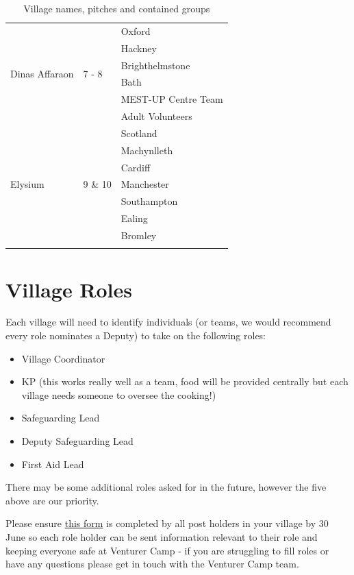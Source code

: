 \documentclass[a4paper, 11pt]{report}
\newcommand{\nl}{\newline}
\begin{document}
{\begin{longtable}{p{} p{} p{}}
        \multirow{6}{*}{Dinas Affaraon} & \multirow{6}{*}{7 - 8} & Oxford\\*
        & & Hackney \\*
        & & Brighthelmstone \\*
        & & Bath \\*
        & & MEST-UP Centre Team \\*
        & & Adult Volunteers \\
        \hline

        \multirow{7}{*}{Elysium} & \multirow{7}{*}{9 \& 10} & Scotland\\*
        & & Machynlleth \\*
        & & Cardiff \\*
        & & Manchester \\*
        & & Southampton \\*
        & & Ealing \\*
        & & Bromley \\
        \hline

\caption{Village names, pitches and contained groups}
\end{longtable}
}

\section{Village Roles}
Each village will need to identify individuals (or teams, we would recommend every role nominates a Deputy) to take on the following roles:
\begin{itemize}
    \item Village Coordinator
    \item KP (this works really well as a team, food will be provided centrally but each village needs someone to oversee the cooking!)
    \item Safeguarding Lead
    \item Deputy Safeguarding Lead
    \item First Aid Lead
\end{itemize}
There may be some additional roles asked for in the future, however the five above are our priority.\nl

Please ensure \href{https://forms.gle/HrV2H4Yyr1tsCpBGA}{this form} is completed by all post holders in your village by 30 June so each role holder can be sent information relevant to their role and keeping everyone safe at Venturer Camp - if you are struggling to fill roles or have any questions please get in touch with the Venturer Camp team. 
\end{document}
